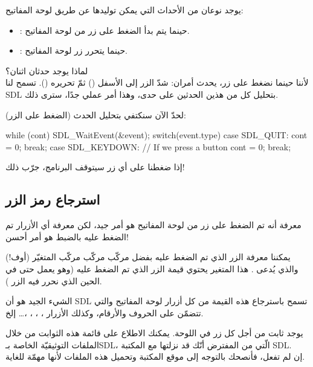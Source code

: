 يوجد نوعان من الأحداث التي يمكن توليدها عن طريق لوحة المفاتيح:

\begin{itemize}
	\item {}:
حينما يتم بدأ الضغط على زر من لوحة المفاتيح.
	\item {}:
حينما يتحرر زر لوحة المفاتيح.
\end{itemize}

لماذا يوجد حدثان اثنان؟\\
لأننا حينما نضغط على زر، يحدث أمران: شدّ الزر إلى الأسفل
()
ثمّ تحريره 
().
تسمح لنا
\textenglish{SDL}
بتحليل كل من هذين الحدثين على حدى، وهذا أمر عملي جدًا، سترى ذلك.

لحدّ الآن سنكتفي بتحليل الحدث
(الضغط على الزر):

\begin{Csource}
while (cont)
{
	SDL_WaitEvent(&event);
	switch(event.type)
	{
		case SDL_QUIT:
		cont = 0;
		break;
		case SDL_KEYDOWN: // If we press a button
		cont = 0;
		break;
	}
}
\end{Csource}

إذا ضغطنا على أي زر سيتوقف البرنامج، جرّب ذلك!

\subsection{استرجاع رمز الزر}

معرفة أنه تم الضغط على زر من لوحة المفاتيح هو أمر جيد، لكن معرفة أي الأزرار تم الضغط عليه بالضبط هو أمر أحسن!

يمكننا معرفة الزر الذي تم الضغط عليه بفضل مركّب مركّب مركّب المتغيّر (أوف!) والذي يُدعى 
.
 هذا المتغير يحتوي قيمة الزر الذي تم الضغط عليه (وهو يعمل حتى في الحين الذي نحرر فيه الزر
).

\begin{information}
الشيء الجيد هو أن
\textenglish{SDL}
تسمح باسترجاع هذه القيمة من كل أزرار لوحة المفاتيح والتي تتضمّن على الحروف والأرقام، وكذلك الأزرار 
، ، ، ،\dots
إلخ.
\end{information}

يوجد ثابت من أجل كل زر في اللوحة. يمكنك الاطلاع على قائمة هذه الثوابت من خلال الملفات التوثيقيّة الخاصة بـ\textenglish{SDL}،
الّتي من المفترض أنّك قد نزلتها مع المكتبة 
\textenglish{SDL}.\\
إن لم تفعل، فأنصحك بالتوجه إلى موقع المكتبة وتحميل هذه الملفات لأنها مهمّة للغاية.


